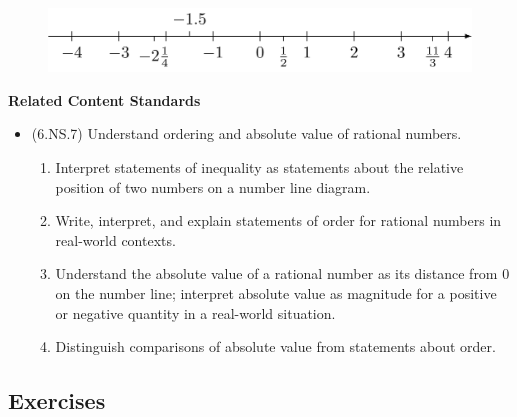 \documentclass[
]{book}
\providecommand{\tightlist}{%
  \setlength{\itemsep}{0pt}\setlength{\parskip}{0pt}}
\newenvironment{standards}{}{}
\theoremstyle{definition}
\theoremstyle{definition}
\theoremstyle{definition}
\theoremstyle{definition}
\theoremstyle{remark}
\begin{document}
\begin{figure}

{\centering \includegraphics[width=0.6\linewidth]{tikz/number-line-rationals} 

}

\end{figure}

\begin{standards}

\begin{center}
\textbf{Related Content Standards}

\end{center}

\begin{itemize}
\tightlist
\item
  (6.NS.7) Understand ordering and absolute value of rational numbers.

  \begin{enumerate}
  \def\labelenumi{\alph{enumi}.}
  \tightlist
  \item
    Interpret statements of inequality as statements about the relative position of two numbers on a number line diagram.
  \item
    Write, interpret, and explain statements of order for rational numbers in real-world contexts.
  \item
    Understand the absolute value of a rational number as its distance from 0 on the number line; interpret absolute value as magnitude for a positive or negative quantity in a real-world situation.
  \item
    Distinguish comparisons of absolute value from statements about order.
  \end{enumerate}
\end{itemize}

\end{standards}

\hypertarget{exercises-13}{%
\subsection{Exercises}\label{exercises-13}}
\end{document}

